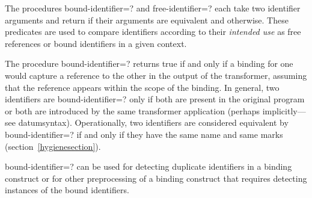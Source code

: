 The procedures {\cf bound-identifier=?} and {\cf free-identifier=?}
each take two identifier arguments and return \schtrue{} if their
arguments are equivalent and \schfalse{} otherwise.
These predicates are used to compare identifiers according to their
\emph{intended use} as free references or bound identifiers in a given
context.

\begin{entry}{%
}

The procedure {\cf bound-identifier=?} returns true if and only if a
binding for one would capture a reference to the other in the output of
the transformer, assuming that the reference appears within the scope of
the binding.
In general, two identifiers are {\cf bound-identifier=?} only if
both are present in the original program or both are introduced by the
same transformer application
(perhaps implicitly---see {\cf datum\coerce{}syntax}).
Operationally, two identifiers are
considered equivalent by {\cf bound-identifier=?} if and only if they
have the same name and same marks (section~\ref{hygienesection}).

{\cf bound-identifier=?} can be used for detecting
duplicate identifiers in a binding construct or for other
preprocessing of a binding construct that requires detecting instances
of the bound identifiers.
\end{entry}

